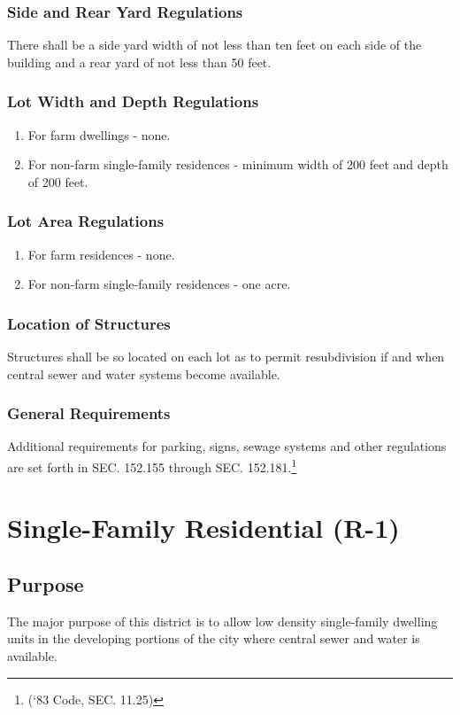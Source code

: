 \subsubsection{Side and Rear Yard Regulations}
There shall be a side yard width of not less than ten feet on each side of the building and a rear yard of not less than 50 feet.
\subsubsection{Lot Width and Depth Regulations}
\begin{enumerate}[{\indent}a)]
    \item For farm dwellings - none.
    \item For non-farm single-family residences - minimum width of 200 feet and depth of 200 feet.
\end{enumerate}
\subsubsection{Lot Area Regulations}
\begin{enumerate}[{\indent}a)]
    \item For farm residences - none.
    \item For non-farm single-family residences - one acre.
\end{enumerate}
\subsubsection{Location of Structures}
Structures shall be so located on each lot as to permit resubdivision if and when central sewer and water systems become available.
\subsubsection{General Requirements}
Additional requirements for parking, signs, sewage systems and other regulations are set forth in SEC. 152.155 through SEC. 152.181.\footnote{(‘83 Code, SEC. 11.25)}

\section{Single-Family Residential (R-1)}
\subsection{Purpose}
The major purpose of this district is to allow low density single-family dwelling units in the developing portions of the city where central sewer and water is available.
